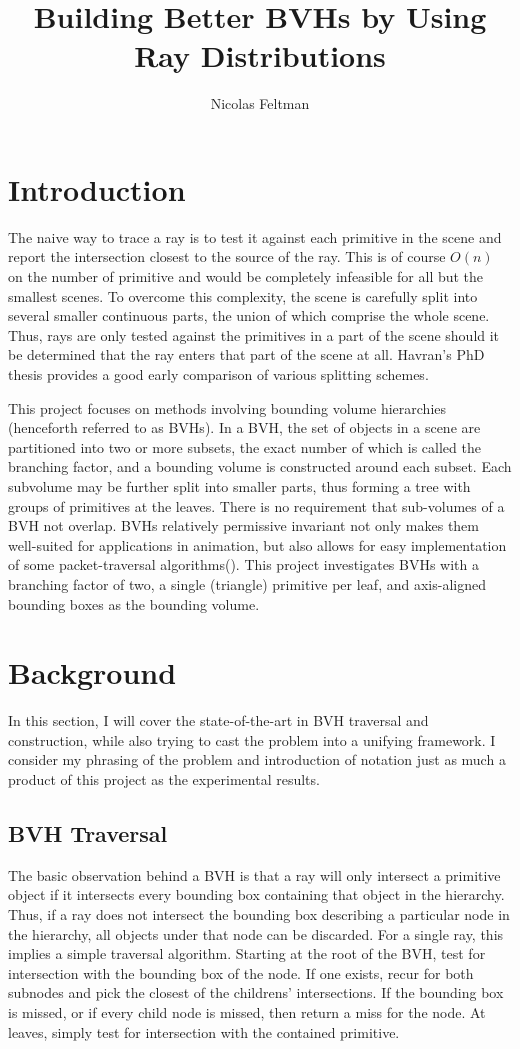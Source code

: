 \documentclass[twocolumn]{article}
\title{Building Better BVHs by Using Ray Distributions}
\author{Nicolas Feltman}
\begin{document}
\maketitle
\section{Introduction}
The naive way to trace a ray is to test it against each primitive in the scene and report the intersection closest to the source of the ray.  This is of course $O(n)$ on the number of primitive and would be completely infeasible for all but the smallest scenes.   To overcome this complexity, the scene is carefully split into several smaller continuous parts, the union of which comprise the whole scene.  Thus, rays are only tested against the primitives in a part of the scene should it be determined that the ray enters that part of the scene at all.  Havran's PhD thesis \cite{Havran00} provides a good early comparison of various splitting schemes.  

This project focuses on methods involving bounding volume hierarchies (henceforth referred to as BVHs).  In a BVH, the set of objects in a scene are partitioned into two or more subsets, the exact number of which is called the branching factor, and a bounding volume is constructed around each subset.  Each subvolume may be further split into smaller parts, thus forming a tree with groups of primitives at the leaves. There is no requirement that sub-volumes of a BVH not overlap.  BVHs relatively permissive invariant not only makes them well-suited for applications in animation, but also allows for easy implementation of some packet-traversal algorithms(\cite{Wald07}).  This project investigates BVHs with a branching factor of two, a single (triangle) primitive per leaf, and axis-aligned bounding boxes as the bounding volume.\

\section{Background}
In this section, I will cover the state-of-the-art in BVH traversal and construction, while also trying to cast the problem into a unifying framework.  I consider my phrasing of the problem and introduction of notation just as much a product of this project as the experimental results.
\subsection{BVH Traversal}
\label{Traversal}
The basic observation behind a BVH is that a ray will only intersect a primitive object if it intersects every bounding box containing that object in the hierarchy.  Thus, if a ray does not intersect the bounding box describing a particular node in the hierarchy, all objects under that node can be discarded.  For a single ray, this implies a simple traversal algorithm.  Starting at the root of the BVH, test for intersection with the bounding box of the node.  If one exists, recur for both subnodes and pick the closest of the childrens' intersections.  If the bounding box is missed, or if every child node is missed, then return a miss for the node.  At leaves, simply test for intersection with the contained primitive.  
\end{document}
